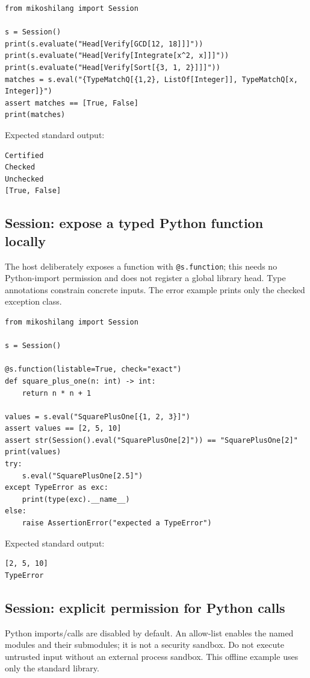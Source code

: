 \begin{lstlisting}[style=mikoshi]
from mikoshilang import Session

s = Session()
print(s.evaluate("Head[Verify[GCD[12, 18]]]"))
print(s.evaluate("Head[Verify[Integrate[x^2, x]]]"))
print(s.evaluate("Head[Verify[Sort[{3, 1, 2}]]]"))
matches = s.eval("{TypeMatchQ[{1,2}, ListOf[Integer]], TypeMatchQ[x, Integer]}")
assert matches == [True, False]
print(matches)
\end{lstlisting}
\noindent Expected standard output:
\begin{lstlisting}[style=mikoshi]
Certified
Checked
Unchecked
[True, False]
\end{lstlisting}

\subsection{Session: expose a typed Python function locally}
The host deliberately exposes a function with \texttt{@s.function}; this needs no Python-import permission and does not register a global library head. Type annotations constrain concrete inputs. The error example prints only the checked exception class.

\begin{lstlisting}[style=mikoshi]
from mikoshilang import Session

s = Session()

@s.function(listable=True, check="exact")
def square_plus_one(n: int) -> int:
    return n * n + 1

values = s.eval("SquarePlusOne[{1, 2, 3}]")
assert values == [2, 5, 10]
assert str(Session().eval("SquarePlusOne[2]")) == "SquarePlusOne[2]"
print(values)
try:
    s.eval("SquarePlusOne[2.5]")
except TypeError as exc:
    print(type(exc).__name__)
else:
    raise AssertionError("expected a TypeError")
\end{lstlisting}
\noindent Expected standard output:
\begin{lstlisting}[style=mikoshi]
[2, 5, 10]
TypeError
\end{lstlisting}

\subsection{Session: explicit permission for Python calls}
Python imports/calls are disabled by default. An allow-list enables the named modules and their submodules; it is not a security sandbox. Do not execute untrusted input without an external process sandbox. This offline example uses only the standard library.

